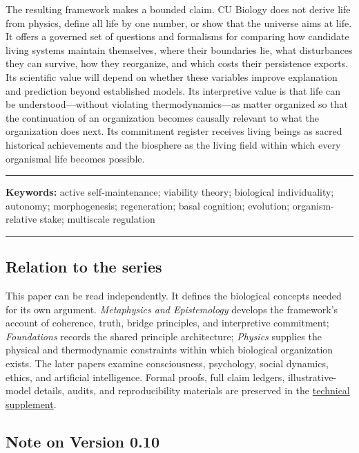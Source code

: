 \documentclass[
  11pt,
]{article}
\begin{document}
The resulting framework makes a bounded claim. CU Biology does not
derive life from physics, define all life by one number, or show that
the universe aims at life. It offers a governed set of questions and
formalisms for comparing how candidate living systems maintain
themselves, where their boundaries lie, what disturbances they can
survive, how they reorganize, and which costs their persistence exports.
Its scientific value will depend on whether these variables improve
explanation and prediction beyond established models. Its interpretive
value is that life can be understood---without violating
thermodynamics---as matter organized so that the continuation of an
organization becomes causally relevant to what the organization does
next. Its commitment register receives living beings as sacred
historical achievements and the biosphere as the living field within
which every organismal life becomes possible.

\begin{center}\rule{0.5\linewidth}{0.5pt}\end{center}

\textbf{Keywords:} active self-maintenance; viability theory; biological
individuality; autonomy; morphogenesis; regeneration; basal cognition;
evolution; organism-relative stake; multiscale regulation

\begin{center}\rule{0.5\linewidth}{0.5pt}\end{center}

\subsection{Relation to the series}\label{relation-to-the-series}

This paper can be read independently. It defines the biological concepts
needed for its own argument. \emph{Metaphysics and Epistemology}
develops the framework's account of coherence, truth, bridge principles,
and interpretive commitment; \emph{Foundations} records the shared
principle architecture; \emph{Physics} supplies the physical and
thermodynamic constraints within which biological organization exists.
The later papers examine consciousness, psychology, social dynamics,
ethics, and artificial intelligence. Formal proofs, full claim ledgers,
illustrative-model details, audits, and reproducibility materials are
preserved in the
\href{../supplements/04_Biology_Technical_Supplement_v0.10.md}{technical
supplement}.

\subsection{Note on Version 0.10}\label{note-on-version-0.10}
\end{document}

